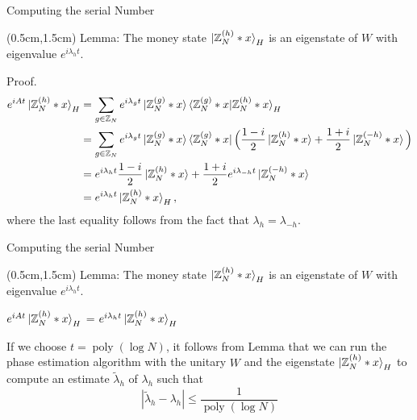 \documentclass{beamer}
\theoremstyle{definition}
\begin{document}
\begin{frame}{Computing the serial Number}

    \begin{textblock*}{12cm}(0.5cm,1.5cm)
        Lemma: The money state $\ket{\mathbb{Z}_N^{(h)} * x}_H$ is an eigenstate of $W$ with eigenvalue $e^{i\lambda_h t}$.
        \vspace{1cm}
        

        Proof. 
        \begin{align*}
            e^{iAt} \ket{\mathbb{Z}_N^{(h)} * x}_H
            & = \sum_{g \in \mathbb{Z}_N} e^{i\lambda_gt} \ket{\mathbb{Z}_N^{(g)} * x}\braket{\mathbb{Z}_N^{(g)} * x|\mathbb{Z}_N^{(h)} * x}_H \\
            & = \sum_{g \in \mathbb{Z}_N} e^{i\lambda_gt} \ket{\mathbb{Z}_N^{(g)} * x} \bra{\mathbb{Z}_N^{(g)} * x} \Big( \frac{1 - i}{2} \ket{\mathbb{Z}_N^{(h)} * x} + \frac{1 + i}{2} \ket{\mathbb{Z}_N^{(-h)} * x} \Big) \\
            & = e^{i\lambda_{h}t} \frac{1 - i}{2} \ket{\mathbb{Z}_N^{(h)} * x} + \frac{1 + i}{2} e^{i\lambda_{-h}t} \ket{\mathbb{Z}_N^{(-h)} * x} \\
            & = e^{i\lambda_{h}t} \ket{\mathbb{Z}_N^{(h)} * x}_H,
        \end{align*}
        where the last equality follows from the fact that $\lambda_h = \lambda_{-h}$.
    \end{textblock*}

 \end{frame}



 
\begin{frame}{Computing the serial Number}

    \begin{textblock*}{12cm}(0.5cm,1.5cm)
        Lemma: The money state $\ket{\mathbb{Z}_N^{(h)} * x}_H$ is an eigenstate of $W$ with eigenvalue $e^{i\lambda_h t}$.
        \vspace{1cm}

        $e^{iAt} \ket{\mathbb{Z}_N^{(h)} * x}_H$ = $e^{i\lambda_{h}t} \ket{\mathbb{Z}_N^{(h)} * x}_H$
        
        \vspace{1cm}
        If we choose $t = \operatorname{poly}(\log N)$, it follows from Lemma that we can run the phase estimation algorithm with the unitary $W$ and the eigenstate $\ket{\mathbb{Z}_N^{(h)} * x}_H$ to compute an estimate $\tilde{\lambda}_h$ of $\lambda_h$ such that %
        \[
        |\tilde{\lambda}_h - \lambda_h| \leq \frac{1}{\operatorname{poly}(\log N)}
        \]
        

        
    \end{textblock*}

 \end{frame}



 

\end{document}
